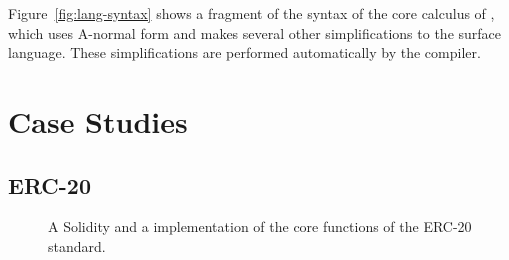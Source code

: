 \documentclass[dvipsnames, usenames, sigconf]{acmart}
\begin{document}
Figure~\ref{fig:lang-syntax} shows a fragment of the syntax of the core calculus of \langName, which uses A-normal form and makes several other simplifications to the surface \langName language.
These simplifications are performed automatically by the compiler.

\section{Case Studies}
\subsection{ERC-20}
\begin{figure*}[h]
    \centering
    \begin{minipage}[t]{0.5\textwidth}
        
    \end{minipage}%
    \begin{minipage}[t]{0.5\textwidth}
        
    \end{minipage}
    \caption{A Solidity and a \langName implementation of the core functions of the ERC-20 standard.}
    \label{fig:erc20-impl}
\end{figure*}
\end{document}
